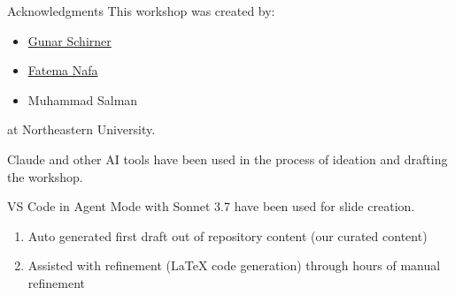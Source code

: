 \documentclass[xcolor=dvipsnames, aspectratio=169]{beamer}
\begin{document}
\begin{frame}{Acknowledgments}
  This workshop was created by:
  \begin{itemize}
    \item \href{https://coe.northeastern.edu/people/schirner-gunar/}{Gunar Schirner}
    \item \href{https://coe.northeastern.edu/people/nafa-fatema/}{Fatema Nafa}
    \item Muhammad Salman
  \end{itemize}
  
  at Northeastern University.
  
  \vspace{1em}
  
  Claude and other AI tools have been used in the process of ideation and drafting the workshop.

  VS Code in Agent Mode with Sonnet 3.7 have been used for slide creation.
  \begin{enumerate}
    \item Auto generated first draft out of repository content (our curated content)  
    \item Assisted with refinement (LaTeX code generation) through hours of manual refinement
  \end{enumerate}
\end{frame}
\end{document}
